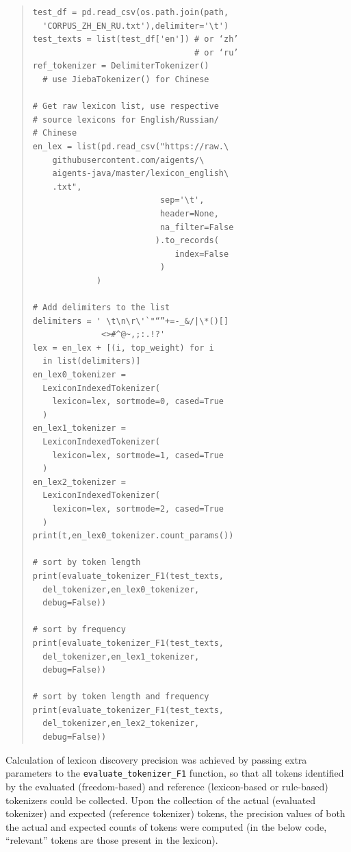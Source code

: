 \documentclass[11pt]{article}
\begin{document}
\begin{quote}\begin{small}
\begin{verbatim}
test_df = pd.read_csv(os.path.join(path,
  'CORPUS_ZH_EN_RU.txt'),delimiter='\t')
test_texts = list(test_df['en']) # or ‘zh’
                                 # or ‘ru’
ref_tokenizer = DelimiterTokenizer() 
  # use JiebaTokenizer() for Chinese

# Get raw lexicon list, use respective 
# source lexicons for English/Russian/
# Chinese
en_lex = list(pd.read_csv("https://raw.\
    githubusercontent.com/aigents/\
    aigents-java/master/lexicon_english\
    .txt",
                          sep='\t',
                          header=None,
                          na_filter=False
                         ).to_records(
                             index=False
                          )
             )

# Add delimiters to the list
delimiters = ' \t\n\r\'`"“”+=-_&/|\*()[]
              <>#^@~,;:.!?'
lex = en_lex + [(i, top_weight) for i 
  in list(delimiters)]
en_lex0_tokenizer = 
  LexiconIndexedTokenizer(
    lexicon=lex, sortmode=0, cased=True
  )
en_lex1_tokenizer = 
  LexiconIndexedTokenizer(
    lexicon=lex, sortmode=1, cased=True
  )
en_lex2_tokenizer = 
  LexiconIndexedTokenizer(
    lexicon=lex, sortmode=2, cased=True
  )
print(t,en_lex0_tokenizer.count_params())

# sort by token length
print(evaluate_tokenizer_F1(test_texts,
  del_tokenizer,en_lex0_tokenizer,
  debug=False))

# sort by frequency
print(evaluate_tokenizer_F1(test_texts,
  del_tokenizer,en_lex1_tokenizer,
  debug=False))

# sort by token length and frequency
print(evaluate_tokenizer_F1(test_texts,
  del_tokenizer,en_lex2_tokenizer,
  debug=False))
\end{verbatim}
\end{small}\end{quote}

Calculation of lexicon discovery precision was achieved by passing extra parameters to the \texttt{evaluate\_tokenizer\_F1} function, so that all tokens identified by the evaluated (freedom-based) and reference (lexicon-based or rule-based) tokenizers could be collected. Upon the collection of the actual (evaluated tokenizer) and expected (reference tokenizer) tokens, the precision values of both the actual and expected counts of tokens were computed (in the below code, “relevant” tokens are those present in the lexicon).   
\end{document}

